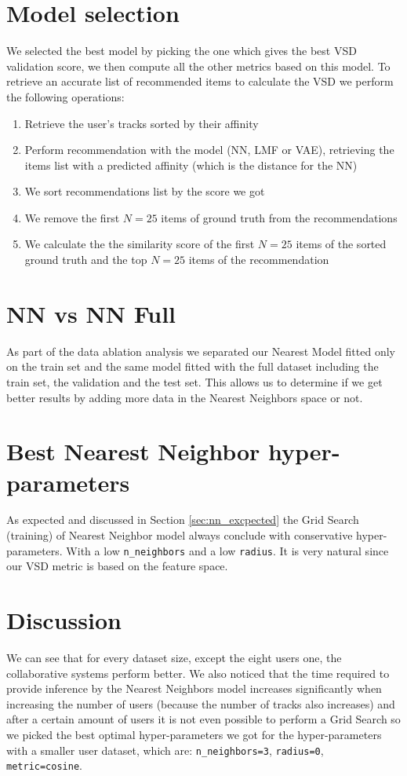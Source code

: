 \section{Model selection}
We selected the best model by picking the one which gives the best VSD validation score, we then compute all the other metrics based on this model. 
To retrieve an accurate list of recommended items to calculate the VSD we perform the following operations:
\begin{enumerate}
    \item Retrieve the user's tracks sorted by their affinity
    \item Perform recommendation with the model (NN, LMF or VAE), retrieving the items list with a predicted affinity (which is the distance for the NN)
    \item We sort recommendations list by the score we got
    \item We remove the first $N=25$ items of ground truth from the recommendations
    \item We calculate the the similarity score of the first $N=25$ items of the sorted ground truth and the top $N=25$ items of the recommendation
\end{enumerate}

\section{NN vs NN Full}
As part of the data ablation analysis we separated our Nearest Model fitted only on the train set and the same model fitted with the full dataset including the train set, the validation and the test set. This allows us to determine if we get better results by adding more data in the Nearest Neighbors space or not.

\section{Best Nearest Neighbor hyper-parameters}
As expected and discussed in Section \ref{sec:nn_excpected}  the Grid Search (training) of Nearest Neighbor model always conclude with conservative hyper-parameters. With a low \texttt{n\_neighbors} and a low \texttt{radius}. It is very natural since our VSD metric is based on the feature space. 

\section{Discussion}
We can see that for every dataset size, except the eight users one, the collaborative systems perform better. We also noticed that the time required to provide inference by the Nearest Neighbors model increases significantly when increasing the number of users (because the number of tracks also increases) and after a certain amount of users it is not even possible to perform a Grid Search so we picked the best optimal hyper-parameters we got for the hyper-parameters with a smaller user dataset, which are: \texttt{n\_neighbors=3}, \texttt{radius=0}, \texttt{metric=cosine}.

